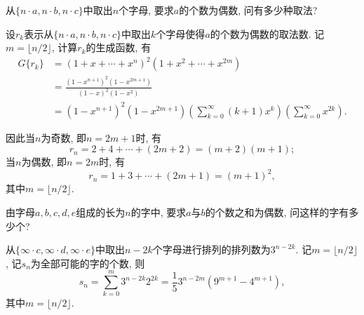 \documentclass[chinese]{assignment}[2019/10/15]
\newcommand{\lr}[3]{\left#1#3\right#2}
\newcommand{\lmr}[5]{\left#1#4\middle#2#5\right#3}
\begin{document}
    \begin{problem}
        从$\{n\cdot a, n\cdot b, n\cdot c\}$中取出$n$个字母, 要求$a$的个数为偶数, 问有多少种取法?
    \end{problem}
    \begin{solution}
        设$r_k$表示从$\{n\cdot a, n\cdot b, n\cdot c\}$中取出$k$个字母使得$a$的个数为偶数的取法数. 记$m=\lfloor n/2\rfloor$, 计算$r_k$的生成函数, 有
        \begin{equation}
            \begin{aligned}
                G\{r_k\}
                &= (1 + x + \dotsb + x^n)^2(1 + x^2 + \dotsb + x^{2m})\\
                &= \frac{(1-x^{n+1})^2(1-x^{2m+1})}{(1-x)^2(1-x^2)}\\
                &= (1-x^{n+1})^2(1-x^{2m+1})\lr(){\sum_{k=0}^{\infty}(k+1)x^k}\lr(){\sum_{k=0}^\infty x^{2k}}.
            \end{aligned}
        \end{equation}

        因此当$n$为奇数, 即$n=2m+1$时, 有
        \begin{equation}
            r_n = 2 + 4 + \dotsb + (2m + 2) = (m+2)(m+1);
        \end{equation}
        当$n$为偶数, 即$n=2m$时, 有
        \begin{equation}
            r_n = 1 + 3 + \dotsb + (2m + 1) = (m+1)^2,
        \end{equation}
        其中$m = \lfloor n/2 \rfloor$.
    \end{solution}

    \begin{problem}
        由字母$a, b, c, d, e$组成的长为$n$的字中, 要求$a$与$b$的个数之和为偶数, 问这样的字有多少个?
    \end{problem}
    \begin{solution}
        从$\{\infty\cdot c, \infty\cdot d, \infty\cdot e\}$中取出$n-2k$个字母进行排列的排列数为$3^{n-2k}$. 记$m=\lfloor n/2\rfloor$, 记$s_n$为全部可能的字的个数, 则
        \begin{equation}
            s_n = \sum_{k=0}^{m}3^{n-2k}2^{2k}
            = \frac{1}{5}3^{n-2m}\left(9^{m+1}-4^{m+1}\right),
        \end{equation}
        其中$m=\lfloor n/2\rfloor$.
    \end{solution}
\end{document}

